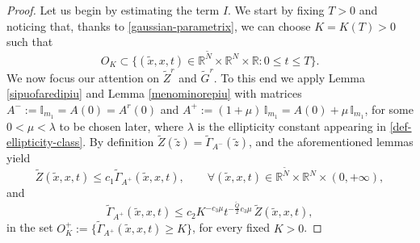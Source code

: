 \documentclass[11pt,a4paper]{article}
\numberwithin{equation}{section}
\newcommand{\R}{\mathbb{R}}
\def \rn {{\mathbb {R}}^{N}}
\def \rnm {{\mathbb {R}}^{\tilde N}}
\def \tt {\tilde}
\def \ti {\times}
\def \G {{\Gamma}}
\begin{document}
{{\begin{proof}
	
	Let us begin by estimating the term $I$. We start by fixing $T>0$ and noticing that, thanks to \eqref{gaussian-parametrix}, we can choose $K=K(T)>0$ such that
	\begin{equation}\label{time-estimate}
		O_K\subset \Big\{(\tt x,x, t)\in \rnm\ti \rn\ti\R : 0\leq t\leq T\Big\}.
	\end{equation}
	We now focus our attention on $\tt Z^r$ and $\tt G^r$. To this end we apply Lemma \ref{sipuofaredipiu} and Lemma \ref{menominorepiu} with matrices $A^-:=\mathbb{I}_{m_1}=A(0)=A^r(0)$ and $A^+:=(1+\mu) \, \mathbb{I}_{m_1}=A(0)+\mu \, \mathbb{I}_{m_1}$, for some $0<\mu<\lambda$ to be chosen later, where $\lambda$ is the ellipticity constant appearing in \eqref{def-ellipticity-class}. By definition $\tt Z(\tt z)=\tt\G_{A^-}(\tt z)$, and the aforementioned lemmas yield 
	\begin{equation}\label{new-estimate-z}
		\tt Z (\tilde x,x,t)\leq c_1 \tt \Gamma_{A^+}(\tilde x,x,t) , \qquad \forall(\tilde x,x,t) \in \rnm\times \rn \times (0,+\infty), 
	\end{equation} 
	and
	\begin{equation}\label{marina-di-ragusa}
		\tt\G_{A^{+}}(\tilde x,x,t) \leq c_2 K^{-c_3\mu} t^{-\frac{\tt Q}{2} c_3 \mu}\, \tt Z(\tilde x,x,t),
	\end{equation}
	in the set $O_K^+:=\Big\{\tt\G_{A^+}(\tt x,x,t) \geq K \Big\} $, for every fixed $K>0$.
	

\end{proof}}}
\end{document}
